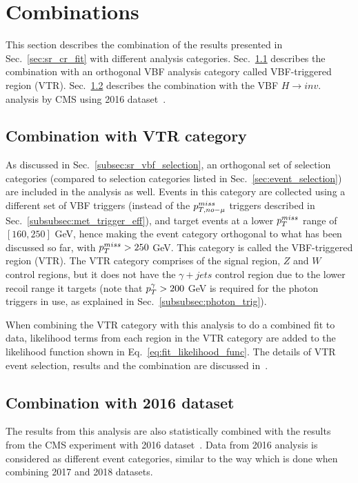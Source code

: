 \section{Combinations}

\graphicspath{{4_Results/Figures}}

\newcommand\combPlotDir{from_paper}

This section describes the combination of the results presented in Sec.~\ref{sec:sr_cr_fit}
with different analysis categories. Sec.~\ref{subsec:comb_with_vtr} describes the combination with
an orthogonal VBF analysis category called VBF-triggered region (VTR). Sec.~\ref{subsec:comb_with_2016}
describes the combination with the VBF $H \rightarrow inv.$ analysis by CMS using 2016 dataset~\cite{paper:VBF_HToInv_2016}.   

\subsection{Combination with VTR category}
\label{subsec:comb_with_vtr}

As discussed in Sec.~\ref{subsec:sr_vbf_selection}, an orthogonal set of selection categories (compared to selection categories listed in Sec.~\ref{sec:event_selection})
are included in the analysis as well. 
Events in this category are collected using a different set of VBF triggers (instead of the $p_{T,no-\mu}^{miss}$ triggers
described in Sec.~\ref{subsubsec:met_trigger_eff}), and target events at a lower $p_T^{miss}$ range of $[160, 250]$ GeV, hence making the event category
orthogonal to what has been discussed so far, with $p_T^{miss} > 250$ GeV.
This category is called the VBF-triggered region (VTR). The VTR category comprises of the signal region, $Z$ and $W$ control regions, but it does not
have the $\gamma + jets$ control region due to the lower recoil range it targets (note that $p_T^{\gamma} > 200$ GeV is required for the
photon triggers in use, as explained in Sec.~\ref{subsubsec:photon_trig}). 

When combining the VTR category with this analysis to do a combined fit to data, likelihood terms from each region in the VTR category
are added to the likelihood function shown in Eq.~\ref{eq:fit_likelihood_func}.
The details of VTR event selection, results and the combination are discussed in~\cite{VBFHinvAnalysisPaper}.

\subsection{Combination with 2016 dataset}
\label{subsec:comb_with_2016}
The results from this analysis are also statistically combined with the results from the CMS experiment
with 2016 dataset~\cite{paper:VBF_HToInv_2016}. Data from 2016 analysis is considered as different event categories,
similar to the way which is done when combining 2017 and 2018 datasets. 

